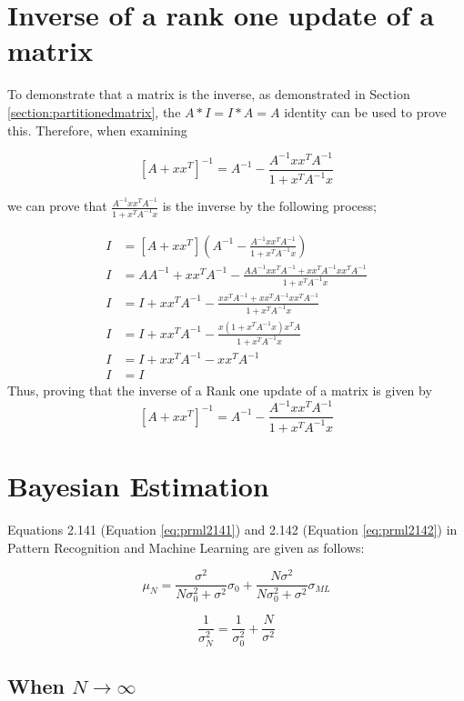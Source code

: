 \documentclass[a4paper, 11pt]{article}
\begin{document}
\section{Inverse of a rank one update of a matrix}

To demonstrate that a matrix is the inverse, as demonstrated in Section \ref{section:partitionedmatrix}, the $A*I = I*A = A$ identity can be used to prove this. Therefore, when examining 

$$ [A + xx^T ]^{-1} = A^{-1} - \frac{A^{-1}xx^TA^{-1}}{1 + x^TA^{-1}x}$$

we can prove that $\frac{A^{-1}xx^TA^{-1}}{1 + x^TA^{-1}x}$ is the inverse by the following process;

\begin{align*}
    I &= [A + xx^T ] \left(A^{-1} - \frac{A^{-1}xx^TA^{-1}}{1 + x^TA^{-1}x}\right) \\
    I &= AA^{-1} + xx^TA^{-1} - \frac{AA^{-1}xx^TA^{-1} + xx^TA^{-1}xx^TA^{-1}}{1 + x^TA^{-1}x}\\
    I &= I + xx^TA^{-1} - \frac{xx^TA^{-1} + xx^TA^{-1}xx^TA^{-1}}{1+x^TA^{-1}x} \\
    I &= I + xx^TA^{-1} - \frac{x(1+x^TA^{-1}x)x^TA}{1+x^TA^{-1}x} \\
    I &= I + xx^TA^{-1} - xx^TA^{-1} \\
    I &= I
\end{align*}
 Thus, proving that the inverse of a Rank one update of a matrix is given by 
$$ [A + xx^T ]^{-1} = A^{-1} - \frac{A^{-1}xx^TA^{-1}}{1 + x^TA^{-1}x}$$

\section{Bayesian Estimation}

Equations 2.141 (Equation \ref{eq:prml2141}) and 2.142 (Equation \ref{eq:prml2142}) in Pattern Recognition and Machine Learning are given as follows:

\begin{equation} \label{eq:prml2141}
\mu_N = \frac{\sigma^2}{N\sigma_0^2 + \sigma^2}\sigma_0 + \frac{N\sigma^2}{N\sigma_0^2 + \sigma^2}\sigma_{ML}
\end{equation}

\begin{equation} \label{eq:prml2142}
\frac{1}{\sigma^2_N} = \frac{1}{\sigma^2_0} + \frac{N}{\sigma^2}
\end{equation}

\subsection{When $N \rightarrow \infty$}
\end{document}
